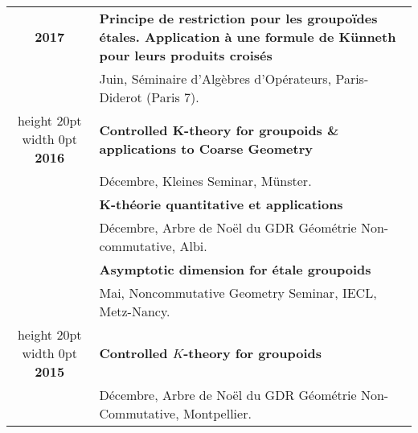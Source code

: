 \documentclass[a4paper,11pt]{article}
\newcommand\espace{\vrule height 20pt width 0pt}
\begin{document}
\begin{tabular}{cp{}}
\textbf{2017} & \textbf{Principe de restriction pour les groupoïdes étales. Application à une formule de Künneth pour leurs produits croisés}\\
				& Juin, Séminaire d'Algèbres d'Opérateurs, Paris-Diderot (Paris 7).\\
				\espace	
\textbf{2016} & \textbf{Controlled K-theory for groupoids \& applications to Coarse Geometry}\\
				& D\'ecembre, Kleines Seminar, Münster.\\
				& \textbf{K-théorie quantitative et applications}\\
				& D\'ecembre, Arbre de Noël du GDR Géométrie Non-commutative, Albi.\\
				& \textbf{Asymptotic dimension for étale groupoids} \\
				& Mai, Noncommutative Geometry Seminar, IECL, Metz-Nancy.\\
				\espace	
\textbf{2015} & \textbf{Controlled $K$-theory for groupoids}\\
				& D\'ecembre, Arbre de Noël du GDR Géométrie Non-Commutative, Montpellier.\\
\end{tabular}
\end{document}
